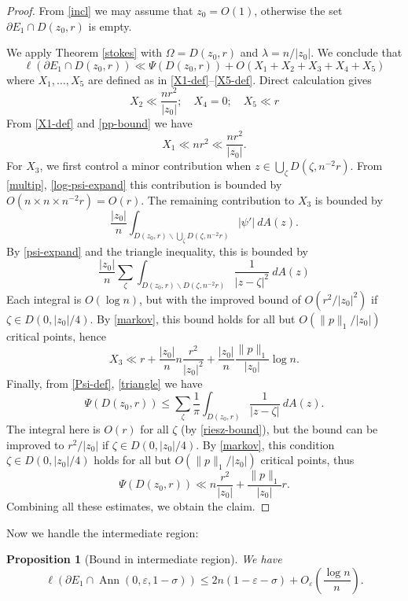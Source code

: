 \documentclass[12pt]{amsart}
\newtheorem{proposition}[theorem]{Proposition}
\newcommand{\eps}{\varepsilon}
\newcommand{\Ann}{\operatorname{Ann}}
\begin{document}
\begin{proof}  From \eqref{incl} we may assume that $z_0 = O(1)$, otherwise the set $\partial E_1 \cap D(z_0,r)$ is empty.

    We apply Theorem \ref{stokes} with $\Omega = D(z_0,r)$ and $\lambda = n/|z_0|$.  We conclude that
$$ \ell(\partial E_1 \cap D(z_0,r)) \ll \Psi(D(z_0,r)) + O( X_1 + X_2 + X_3 + X_4 + X_5)$$
where $X_1,\dots,X_5$ are defined as in \eqref{X1-def}--\eqref{X5-def}.  Direct calculation gives
$$ X_2 \ll \frac{n r^2}{|z_0|}; \quad X_4 = 0; \quad X_5 \ll r$$
From \eqref{X1-def} and \eqref{pp-bound} we have
$$ X_1 \ll n r^2 \ll \frac{nr^2}{|z_0|}.$$
For $X_3$, we first control a minor contribution when $z \in \bigcup_\zeta D(\zeta, n^{-2} r)$.  From \eqref{multip}, \eqref{log-psi-expand} this contribution is bounded by $O(n \times n \times n^{-2} r) = O(r)$.  The remaining contribution to $X_3$ is bounded by
$$ \frac{|z_0|}{n} \int_{D(z_0,r) \backslash \bigcup_\zeta D(\zeta,n^{-2} r)} |\psi'|\ dA(z).$$
By \eqref{psi-expand} and the triangle inequality, this is bounded by
$$ \frac{|z_0|}{n} \sum_\zeta \int_{D(z_0,r) \backslash D(\zeta,n^{-2} r)} \frac{1}{|z-\zeta|^2}\ dA(z)$$
Each integral is $O(\log n)$, but with the improved bound of $O( r^2/|z_0|^2 )$ if $\zeta \in D(0,|z_0|/4)$.  By \eqref{markov}, this bound holds for all but $O(\|p\|_1/|z_0|)$ critical points, hence
$$ X_3 \ll r + \frac{|z_0|}{n} n \frac{r^2}{|z_0|^2} + \frac{|z_0|}{n} \frac{\|p\|_1}{|z_0|} \log n.$$
Finally, from \eqref{Psi-def}, \eqref{triangle} we have
\begin{equation}\label{tri-use}
  \Psi(D(z_0,r)) \leq \sum_\zeta \frac{1}{\pi} \int_{D(z_0,r)} \frac{1}{|z-\zeta|}\ dA(z).
\end{equation}
The integral here is $O(r)$ for all $\zeta$ (by \eqref{riesz-bound}), but the bound can be improved to $r^2 / |z_0|$ if $\zeta \in D(0, |z_0|/4)$.  By \eqref{markov}, this condition $\zeta \in D(0,|z_0|/4)$ holds for  all but $O(\|p\|_1/|z_0|)$ critical points, thus
$$ \Psi(D(z_0,r)) \ll n \frac{r^2}{|z_0|} + \frac{\|p\|_1}{|z_0|} r.$$
Combining all these estimates, we obtain the claim.
\end{proof}

Now we handle the intermediate region:

\begin{proposition}[Bound in intermediate region]\label{annulus}  We have
    $$ \ell(\partial E_1 \cap \Ann(0,\eps,1-\sigma)) \leq 2n (1-\eps-\sigma) + O_\eps\left(\frac{\log n}{n} \right).$$
\end{proposition}
\end{document}
